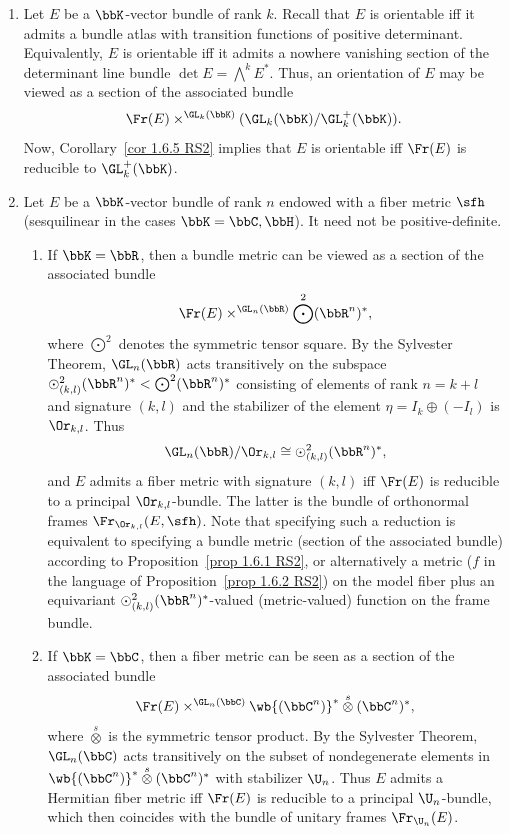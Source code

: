 \begin{example}[{{\cite[Ex.~1.6.6]{RS2}}}]\label{ex 1.6.6 RS2}
    \begin{enumerate}
        \item Let $E$ be a $\bbK$-vector bundle of rank $k$. Recall that $E$ is orientable iff it admits a bundle atlas with transition functions of positive determinant. Equivalently, $E$ is orientable iff it admits a nowhere vanishing section of the determinant line bundle $\det E=\bigwedge^k E^\ast$. Thus, an orientation of $E$ may be viewed as a section of the associated bundle
        \[\Fr(E)\times^{\GL_k(\bbK)}(\GL_k(\bbK)\slash \GL^+_k(\bbK)).\]
        Now, Corollary~\ref{cor 1.6.5 RS2} implies that $E$ is orientable iff $\Fr(E)$ is reducible to $\GL_k^+(\bbK)$.

        \item Let $E$ be a $\bbK$-vector bundle of rank $n$ endowed with a fiber metric $\sfh$ (sesquilinear in the cases $\bbK=\bbC,\bbH$). It need not be positive-definite.
        \begin{enumerate}
            \item If $\bbK=\bbR$, then a bundle metric can be viewed as a section of the associated bundle
            \[\Fr(E)\times^{\GL_n(\bbR)} \bigodot^2(\bbR^n)^\ast,\]
            where $\bigodot^2$ denotes the symmetric tensor square. By the Sylvester Theorem, $\GL_n(\bbR)$ acts transitively on the subspace $\odot^2_{(k,l)}(\bbR^n)^\ast< \bigodot^2(\bbR^n)^\ast$ consisting of elements of rank $n=k+l$ and signature $(k,l)$ and the stabilizer of the element $\eta=I_k\oplus (-I_l)$ is $\Or_{k,l}$. Thus
            \[\GL_n(\bbR)\slash \Or_{k,l}\cong \odot^2_{(k,l)}(\bbR^n)^\ast,\]
            and $E$ admits a fiber metric with signature $(k,l)$ iff $\Fr(E)$ is reducible to a principal $\Or_{k,l}$-bundle. The latter is the bundle of orthonormal frames $\Fr_{\Or_{k,l}}(E,\sfh)$. Note that specifying such a reduction is equivalent to specifying a bundle metric (section of the associated bundle) according to Proposition~\ref{prop 1.6.1 RS2}, or alternatively a metric ($f$ in the language of Proposition~\ref{prop 1.6.2 RS2}) on the model fiber plus an equivariant $\odot^2_{(k,l)}(\bbR^n)^\ast$-valued (metric-valued) function on the frame bundle.

            \item If $\bbK=\bbC$, then a fiber metric can be seen as a section of the associated bundle
            \[\Fr(E)\times^{\GL_n(\bbC)} \wb{(\bbC^n)}^\ast\overset{s}{\otimes} (\bbC^n)^\ast,\]
            where $\overset{s}{\otimes}$ is the symmetric tensor product. By the Sylvester Theorem, $\GL_n(\bbC)$ acts transitively on the subset of nondegenerate elements in $\wb{(\bbC^n)}^\ast\overset{s}{\otimes} (\bbC^n)^\ast$ with stabilizer $\U_n$. Thus $E$ admits a Hermitian fiber metric iff $\Fr(E)$ is reducible to a principal $\U_n$-bundle, which then coincides with the bundle of unitary frames $\Fr_{\U_n}(E)$.
        \end{enumerate}
    \end{enumerate}
\end{example}

